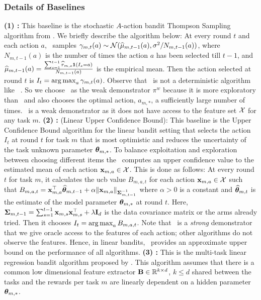 \documentclass[10pt]{article}
\theoremstyle{plain}
\theoremstyle{definition}
\theoremstyle{remark}
\begin{document}
\subsubsection{Details of Baselines}
\label{app:baseline-details}
\textbf{(1) \ts:} This baseline is the stochastic $A$-action bandit Thompson Sampling algorithm from \citet{thompson1933likelihood,agrawal2012analysis,russo2018tutorial,zhu2020thompson}. We briefly describe the algorithm below: At every round $t$ and each action $a$, \ts\  samples $\gamma_{m,t}(a) \sim \mathcal{N}(\widehat{\mu}_{m,t-1}(a), \sigma^2/N_{m,t-1}(a))$, where $N_{m,t-1}(a)$ is the number of times the action $a$ has been selected till $t-1$, and $\widehat{\mu}_{m,t-1}(a) = \frac{\sum_{s=1}^{t-1} \widehat{r}_{m,s}\mathbf{1}(I_s =a)}{N_{m,t-1}(a)}$ is the empirical mean. Then the action selected at round $t$ is $I_{t} = \mathop{\rm arg\,max}_a \gamma_{m,t}(a)$.
Observe that \ts\ is not a deterministic algorithm like \ucb\ \citep{auer2002finite-time}. So we choose \ts\ as the weak demonstrator $\pi^w$ because it is more exploratory than \ucb\ and also chooses the optimal action, $a_{m, *}$, a sufficiently large number of times.
\ts\ is a weak demonstrator as it does not have access to the feature set $\mathcal{X}$ for any task $m$.
\textbf{(2) \linucb:} (Linear Upper Confidence Bound): This baseline is the Upper Confidence Bound algorithm for the linear bandit setting that selects the action $I_t$ at round $t$ for task $m$ that is most optimistic and reduces the uncertainty of the task unknown parameter $\boldsymbol{\theta}_{m,*}$.
To balance exploitation and exploration between choosing different items the \linucb\ computes an upper confidence value to the estimated mean of each action $\mathbf{x}_{m,a} \in \mathcal{X}$.
This is done as follows: At every round $t$ for task $m$, it calculates the ucb value $B_{m,a,t}$ for each action $\mathbf{x}_{m,a} \in \mathcal{X}$ such that $B_{m,a,t} = \mathbf{x}_{m,a}^\top \widehat{\boldsymbol{\theta}}_{m,t-1} + \alpha\|\mathbf{x}_{m,a}\|_{\mathbf{\Sigma}_{m,t-1}^{-1}}$ where $\alpha > 0$ is a constant and $\widehat{\boldsymbol{\theta}}_{m,t}$ is the estimate of the model parameter $\boldsymbol{\theta}_{m, *}$ at round $t$.
Here, $\mathbf{\Sigma}_{m,t-1} = \sum_{s=1}^{t-1}\mathbf{x}_{m,s}\mathbf{x}_{m,s}^\top +\lambda\mathbf{I}_d$ is the data covariance matrix or the arms already tried.
Then it chooses $I_t = \mathop{\rm arg\,max}_{a}B_{m,a,t}$.
Note that \linucb\ is a \textit{strong} demonstrator that we give oracle access to the features of each action; other algorithms do not observe the features.
Hence, in linear bandits, \linucb\ provides an approximate upper bound on the performance of all algorithms.
\textbf{(3) \mlin:} This is the multi-task linear regression bandit algorithm proposed by \citet{yang2021impact}. This algorithm assumes that there is a common low dimensional feature extractor $\mathbf{B}\in\mathbb{R}^{k\times d}$, $k\leq d$ shared between the tasks and the rewards per task $m$ are linearly dependent on a hidden parameter $\boldsymbol{\theta}_{m,*}$.
\end{document}
